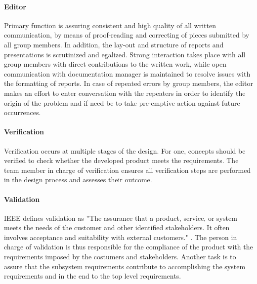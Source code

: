 \paragraph{Editor}
Primary function is assuring consistent and high quality of all written communication, by means of proof-reading and correcting of pieces submitted by all group members. In addition, the lay-out and structure of reports and presentations is scrutinized and egalized. Strong interaction takes place with all group members with direct contributions to the written work, while open communication with documentation manager is maintained to resolve issues with the formatting of reports. In case of repeated errors by group members, the editor makes an effort to enter conversation with the repeaters in order to identify the origin of the problem and if need be to take pre-emptive action against future occurrences.
\paragraph{Verification}
Verification occurs at multiple stages of the design. For one, concepts should be verified to check whether the developed product meets the requirements. The team member in charge of verification ensures all verification steps are performed in the design process and assesses their outcome.

\paragraph{Validation}
IEEE defines validation as ''The assurance that a product, service, or system meets the needs of the customer and other identified stakeholders. It often involves acceptance and suitability with external customers." \cite[p.452]{IEEE}. The person in charge of validation is thus responsible for the compliance of the product with the requirements imposed by the costumers and stakeholders. Another task is to assure that the subsystem requirements contribute to accomplishing the system requirements and in the end to the top level requirements.
